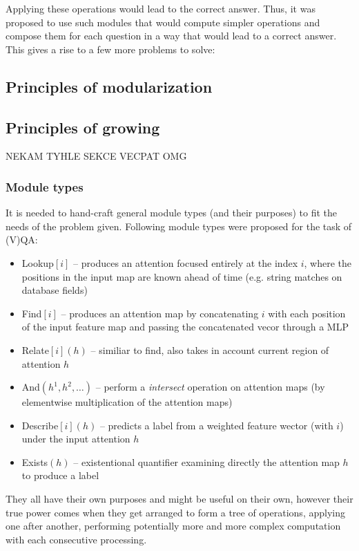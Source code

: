 \documentclass[a4paper,twocolumn]{article}
\begin{document}
Applying these operations would lead to the correct answer. Thus, it was proposed to use such modules that would compute simpler operations and compose them for each question in a way that would lead to a correct answer. This gives a rise to a few more problems to solve:

\subsection*{Principles of modularization}
\subsection*{Principles of growing}
NEKAM TYHLE SEKCE VECPAT OMG
\subsubsection*{Module types}
It is needed to hand-craft general module types (and their purposes) to fit the needs of the problem given. Following module types were proposed for the task of (V)QA:
    \begin{itemize}
        \item Lookup$[i]$ – produces an attention focused entirely at the index $i$, where the positions in the input map are known ahead of time (e.g. string matches on database fields)
        \item Find$[i]$ – produces an attention map by concatenating $i$ with each position of the input feature map and passing the concatenated vecor through a MLP
        \item Relate$[i](h)$ – similiar to find, also takes in account current region of attention $h$
        \item And$(h^1, h^2, \dots)$ – perform a \textit{intersect} operation on attention maps (by elementwise multiplication of the attention maps)
        \item Describe$[i](h)$ – predicts a label from a weighted feature wector (with $i$) under the input attention $h$
        \item Exists$(h)$ – existentional quantifier examining directly the attention map $h$ to produce a label
    \end{itemize}
They all have their own purposes and might be useful on their own, however their true
power comes when they get arranged to form a tree of operations, applying one after another, performing potentially more and more complex computation with each consecutive processing.
\end{document}
